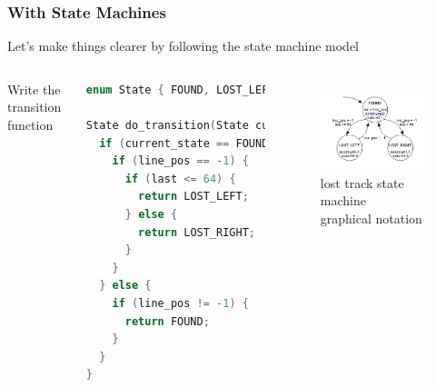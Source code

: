 \documentclass{beamer}
\begin{document}
\begin{frame}[fragile]
\frametitle{With State Machines}
Let's make things clearer by following the state machine model
\vspace{5px}
\begin{columns}[t]
Write the transition function
\begin{lstlisting}[language=C++,basicstyle=\ttfamily\tiny]
enum State { FOUND, LOST_LEFT, LOST_RIGHT };

State do_transition(State current_state, int16_t line_pos, int16_t last) {
  if (current_state == FOUND) {
    if (line_pos == -1) {
      if (last <= 64) {
        return LOST_LEFT;
      } else {
        return LOST_RIGHT;
      }
    }
  } else {
    if (line_pos != -1) {
      return FOUND;
    }
  }
}
\end{lstlisting}

\begin{figure}[h!]
\includegraphics[width=1.0\columnwidth]{images-dis10/statemachine} \\
lost track state machine \\
graphical notation
\end{figure}
\end{columns}
\end{frame}
\end{document}
